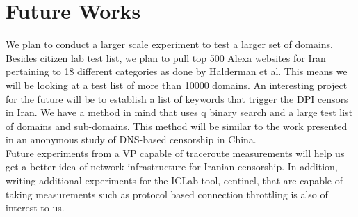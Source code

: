 \section{Future Works}\label{sec:futureworks}
We plan to conduct a larger scale experiment to test a larger set of domains. Besides citizen lab test list, we plan to pull top 500 Alexa websites for Iran pertaining to 18 different categories as done by Halderman et al. This means we will be looking at a test list of more than 10000 domains. An interesting project for the future will be to establish a list of keywords that trigger the DPI censors in Iran. We have a method in mind that uses q binary search and a large test list of domains and sub-domains. This method will be similar to the work presented in an anonymous study of DNS-based censorship in China.\\ Future experiments from a VP capable of traceroute measurements will help us get a better idea of network infrastructure for Iranian censorship. In addition, writing additional experiments for the ICLab tool, centinel, that are capable of taking measurements such as protocol based connection throttling is also of interest to us. 
